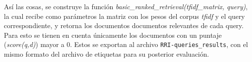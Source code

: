Así las cosas, se construye la función \textit{basic\_ranked\_retrieval(tfidf\_matrix, query)}, la cual recibe como parámetros la matriz con los pesos del corpus \textit{tfidf} y el query correspondiente, y retorna los documentos documentos relevantes de cada query. Para esto se tienen en cuenta únicamente los documentos con un puntaje (\textit{score(q,d)}) mayor a 0. Estos se exportan al archivo \texttt{RRI-queries\_results}, con el mismo formato del archivo de etiquetas para su posterior evaluación.